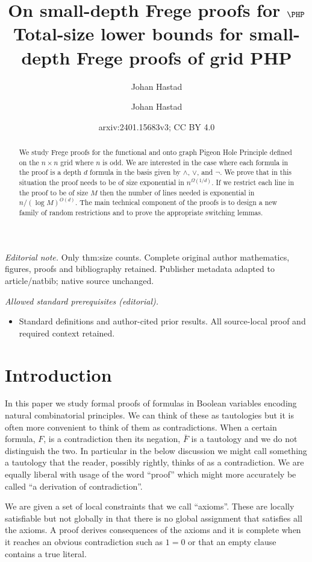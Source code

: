 \documentclass{article}\usepackage[a4paper,margin=20mm]{geometry}
\title{On small-depth Frege proofs for \texorpdfstring{$\PHP$}{PHP}}
\author{Johan Hastad}\date{}
\title{Total-size lower bounds for small-depth Frege proofs of grid PHP}
\author{Johan Hastad}
\date{arxiv:2401.15683v3; CC BY 4.0}
\begin{document}
\maketitle
\noindent\textit{Editorial note.} Only thm:size counts. Complete original author mathematics, figures, proofs and bibliography retained. Publisher metadata adapted to article/natbib; native source unchanged.\par\medskip
\noindent\textit{Allowed standard prerequisites (editorial).}\begin{itemize}
\item Standard definitions and author-cited prior results. All source-local proof and required context retained.
\end{itemize}\medskip
\maketitle

\begin{abstract}
We study Frege proofs for the functional and onto
graph Pigeon Hole Principle
defined on the $n\times n$ grid where $n$ is odd.
We are interested in the case where each formula
in the proof is a depth $d$ formula in the basis given by
$\land$, $\lor$, and $\neg$.  We prove that in this situation the
proof needs to be of size exponential in $n^{\Omega (1/d)}$.
If we restrict each line in the proof to be of
size $M$ then the number of lines needed is exponential
in $n/(\log M)^{O(d)}$.   The main technical component of
the proofs is to design a new family of random restrictions
and to prove the appropriate switching lemmas.
\end{abstract}

\section{Introduction}
In this paper we study formal proofs of formulas in
Boolean variables encoding natural combinatorial principles.
We can think of these as tautologies but it is often
more convenient to think of them as contradictions.
When a certain formula, $F$, is a contradiction then its negation,
$\bar F$ is a tautology and we do not distinguish the two.
In particular in the below discussion we might call something
a tautology that the reader, possibly rightly, thinks of
as a contradiction.  We are equally liberal with usage
of the word ``proof'' which might more accurately be
called ``a derivation of contradiction''.  

We are given a set of local constraints that we call
``axioms''.  These are locally satisfiable but not globally in
that there is no global assignment that satisfies all the axioms.
A proof derives consequences
of the axioms and it is complete when it reaches 
an obvious contradiction such as $1=0$ or that an
empty clause contains a true literal.  
\end{document}
